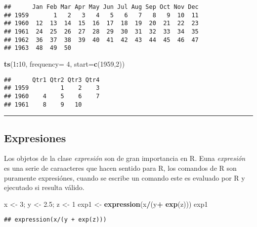 \documentclass[11pt,]{article}
\newenvironment{Shaded}{\begin{snugshade}}{\end{snugshade}}
\newcommand{\DataTypeTok}[1]{\textcolor[rgb]{0.13,0.29,0.53}{#1}}
\newcommand{\DecValTok}[1]{\textcolor[rgb]{0.00,0.00,0.81}{#1}}
\newcommand{\FloatTok}[1]{\textcolor[rgb]{0.00,0.00,0.81}{#1}}
\newcommand{\KeywordTok}[1]{\textcolor[rgb]{0.13,0.29,0.53}{\textbf{#1}}}
\newcommand{\NormalTok}[1]{#1}
\newcommand{\OperatorTok}[1]{\textcolor[rgb]{0.81,0.36,0.00}{\textbf{#1}}}
\newcommand{\StringTok}[1]{\textcolor[rgb]{0.31,0.60,0.02}{#1}}
\begin{document}
\begin{verbatim}
##      Jan Feb Mar Apr May Jun Jul Aug Sep Oct Nov Dec
## 1959       1   2   3   4   5   6   7   8   9  10  11
## 1960  12  13  14  15  16  17  18  19  20  21  22  23
## 1961  24  25  26  27  28  29  30  31  32  33  34  35
## 1962  36  37  38  39  40  41  42  43  44  45  46  47
## 1963  48  49  50
\end{verbatim}

\begin{Shaded}
\begin{Highlighting}[]
\KeywordTok{ts}\NormalTok{(}\DecValTok{1}\OperatorTok{:}\DecValTok{10}\NormalTok{, }\DataTypeTok{frequency=} \DecValTok{4}\NormalTok{, }\DataTypeTok{start=}\KeywordTok{c}\NormalTok{(}\DecValTok{1959}\NormalTok{,}\DecValTok{2}\NormalTok{))}
\end{Highlighting}
\end{Shaded}

\begin{verbatim}
##      Qtr1 Qtr2 Qtr3 Qtr4
## 1959         1    2    3
## 1960    4    5    6    7
## 1961    8    9   10
\end{verbatim}

\begin{center}\rule{0.5\linewidth}{0.5pt}\end{center}

\hypertarget{expresiones}{%
\subsection{Expresiones}\label{expresiones}}

Los objetos de la clase \emph{expresión} son de gran importancia en R.
Euna \emph{expresión} es una serie de caraacteres que hacen sentido para
R, los comandos de R son puramente expresiónes, cuando se escribe un
comando este es evaluado por R y ejecutado si resulta válido.

\begin{Shaded}
\begin{Highlighting}[]
\NormalTok{x <-}\StringTok{ }\DecValTok{3}\NormalTok{; y <-}\StringTok{ }\FloatTok{2.5}\NormalTok{; z <-}\StringTok{ }\DecValTok{1}
\NormalTok{exp1 <-}\StringTok{ }\KeywordTok{expression}\NormalTok{(x}\OperatorTok{/}\NormalTok{(y}\OperatorTok{+}\StringTok{ }\KeywordTok{exp}\NormalTok{(z)))}
\NormalTok{exp1}
\end{Highlighting}
\end{Shaded}

\begin{verbatim}
## expression(x/(y + exp(z)))
\end{verbatim}
\end{document}
